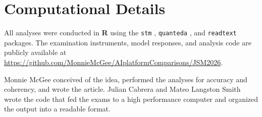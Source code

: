 \documentclass[APA,LATO2COL]{WileyNJDv5}
\newcommand{\proglang}[1]{\textbf{#1}}
\newcommand{\pkg}[1]{\texttt{#1}}
\begin{document}

\section*{Computational Details}



All analyses were conducted in \proglang{R} \cite[version 4.6.0]{rcore}
using the \pkg{stm} \cite{roberts2019}, \pkg{quanteda} \cite{quanteda},
and \pkg{readtext} \cite{readtext} packages. The examination instruments, model responses, and analysis code are publicly available at \url{https://github.com/MonnieMcGee/AIplatformComparisons/JSM2026}. 







\newpage





{}

Monnie McGee conceived of the idea, performed the analyses for accuracy and coherency, and wrote the article. Julian Cabrera and Mateo Langston Smith wrote the code that fed the exams to a high performance computer and organized the output into a readable format.
\end{document}

